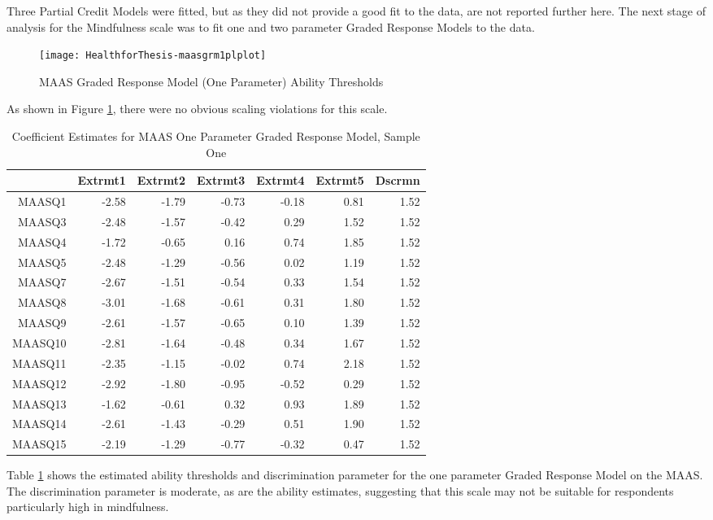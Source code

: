 \documentclass{article}
\begin{document}


Three Partial Credit Models were fitted, but as they did not provide a good fit to the data, are not reported further here. 
The next stage of analysis for the Mindfulness scale was to fit one and two parameter Graded Response Models to the data. 


\begin{figure}
\texttt{[image: HealthforThesis-maasgrm1plplot]}
  \caption{MAAS Graded Response Model (One Parameter) Ability Thresholds}
  \label{fig:maasgrm1plplot}
\end{figure}

As shown in Figure \ref{fig:maasgrm1plplot}, there were no obvious scaling violations for this scale. 

\begin{table}[ht]
\centering
\begin{tabular}{rrrrrrr}
  \hline
 & Extrmt1 & Extrmt2 & Extrmt3 & Extrmt4 & Extrmt5 & Dscrmn \\ 
  \hline
MAASQ1 & -2.58 & -1.79 & -0.73 & -0.18 & 0.81 & 1.52 \\ 
  MAASQ3 & -2.48 & -1.57 & -0.42 & 0.29 & 1.52 & 1.52 \\ 
  MAASQ4 & -1.72 & -0.65 & 0.16 & 0.74 & 1.85 & 1.52 \\ 
  MAASQ5 & -2.48 & -1.29 & -0.56 & 0.02 & 1.19 & 1.52 \\ 
  MAASQ7 & -2.67 & -1.51 & -0.54 & 0.33 & 1.54 & 1.52 \\ 
  MAASQ8 & -3.01 & -1.68 & -0.61 & 0.31 & 1.80 & 1.52 \\ 
  MAASQ9 & -2.61 & -1.57 & -0.65 & 0.10 & 1.39 & 1.52 \\ 
  MAASQ10 & -2.81 & -1.64 & -0.48 & 0.34 & 1.67 & 1.52 \\ 
  MAASQ11 & -2.35 & -1.15 & -0.02 & 0.74 & 2.18 & 1.52 \\ 
  MAASQ12 & -2.92 & -1.80 & -0.95 & -0.52 & 0.29 & 1.52 \\ 
  MAASQ13 & -1.62 & -0.61 & 0.32 & 0.93 & 1.89 & 1.52 \\ 
  MAASQ14 & -2.61 & -1.43 & -0.29 & 0.51 & 1.90 & 1.52 \\ 
  MAASQ15 & -2.19 & -1.29 & -0.77 & -0.32 & 0.47 & 1.52 \\ 
   \hline
\end{tabular}
\caption{Coefficient Estimates for MAAS One Parameter Graded Response Model, Sample One} 
\label{tab:maasgrm1pl}
\end{table}
Table \ref{tab:maasgrm1pl} shows the estimated ability thresholds and discrimination parameter for the one parameter Graded Response Model on the MAAS. The discrimination parameter is moderate, as are the ability estimates, suggesting that this scale may not be suitable for respondents particularly high in mindfulness. 
\end{document}
